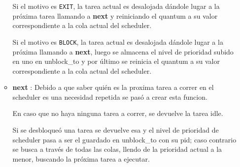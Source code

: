 \begin{itemize}
\begin{itemize}
				Si el motivo es \texttt{EXIT}, la tarea actual es desalojada dándole lugar a la próxima tarea llamando a \textbf{next} y reiniciando el quantum a su valor correspondiente a la cola actual del scheduler.
				
				Si el motivo es \texttt{BLOCK}, la tarea actual es desalojada dándole lugar a la próxima llamando a \textbf{next}, luego se almacena el nivel de prioridad subido en uno en unblock\_to y por último se reinicia el quantum a su valor correspondiente a la cola actual del scheduler.

				\item \textbf{next} : Debido a que saber quién es la proxima tarea a correr en el scheduler es una necesidad repetida se pasó a crear esta funcion.
				
				En caso que no haya ninguna tarea a correr, se devuelve la tarea idle.
				
				Si se desbloqueó una tarea se devuelve esa y el nivel de prioridad de scheduler pasa a ser el guardado en unblock\_to con su pid; caso contrario se busca a través de todas las colas, llendo de la prioridad actual a la menor, buscando la próxima tarea a ejecutar.

			\end{itemize}
	\end{itemize}




